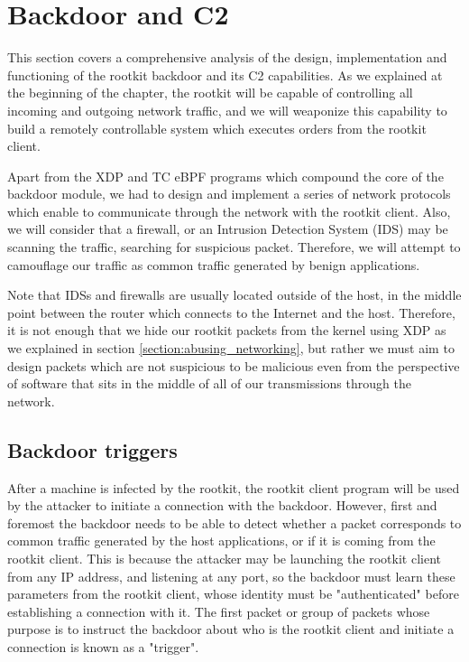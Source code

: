 \section{Backdoor and C2} \label{section:c2}
This section covers a comprehensive analysis of the design, implementation and functioning of the rootkit backdoor and its C2 capabilities. As we explained at the beginning of the chapter, the rootkit will be capable of controlling all incoming and outgoing network traffic, and we will weaponize this capability to build a remotely controllable system which executes orders from the rootkit client.

Apart from the XDP and TC eBPF programs which compound the core of the backdoor module, we had to design and implement a series of network protocols which enable to communicate through the network with the rootkit client. Also, we will consider that a firewall, or an Intrusion Detection System (IDS) \cite{ips} may be scanning the traffic, searching for suspicious packet. Therefore, we will attempt to camouflage our traffic as common traffic generated by benign applications. 

Note that IDSs and firewalls are usually located outside of the host, in the middle point between the router which connects to the Internet and the host. Therefore, it is not enough that we hide our rootkit packets from the kernel using XDP as we explained in section \ref{section:abusing_networking}, but rather we must aim to design packets which are not suspicious to be malicious even from the perspective of software that sits in the middle of all of our transmissions through the network.

\subsection{Backdoor triggers} \label{subsection:triggers}
After a machine is infected by the rootkit, the rootkit client program will be used by the attacker to initiate a connection with the backdoor. However, first and foremost the backdoor needs to be able to detect whether a packet corresponds to common traffic generated by the host applications, or if it is coming from the rootkit client. This is because the attacker may be launching the rootkit client from any IP address, and listening at any port, so the backdoor must learn these parameters from the rootkit client, whose identity must be "authenticated" before establishing a connection with it. The first packet or group of packets whose purpose is to instruct the backdoor about who is the rootkit client and initiate a connection is known as a "trigger".

